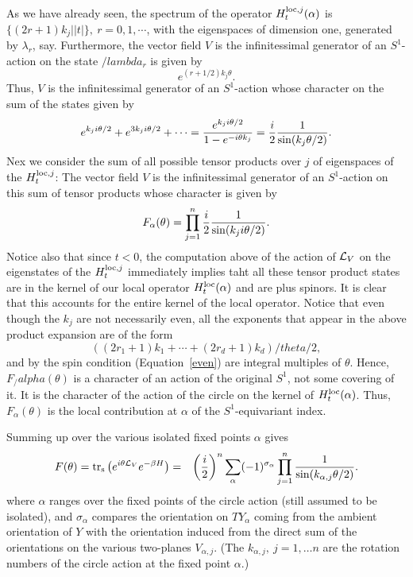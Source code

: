As we have already seen, the spectrum of the operator $H_t^{{\rm
loc},j}(\alpha)$  
is $\{(2r+1)k_j||t|\},\ r=0,1,\cdots$, with the eigenspaces of
dimension one, generated by $\lambda_r$, say.
Furthermore,  the vector field $V$ is the infinitessimal generator of
an $S^1$-action on the 
state  $/lambda_r$ is given by 
$$e^{(r+1/2)k_j\theta}.$$
Thus, $V$ is the infinitessimal generator of an $S^1$-action whose character
on the sum of the states given by 
\begin{equation}\label{thetaform}
e^{k_ji\theta/2}+e^{3k_ji\theta/2}+\cdots
=\frac{e^{k_ji\theta/2}}{1-e^{-i\theta k_j}}= \frac{i}{2}\frac{1}{{\rm
sin}(k_j\theta/2)}. 
\end{equation}
Nex we consider the sum of all possible tensor products over $j$ of 
eigenspaces of the $H_t^{{\rm loc},j}$:
The  vector field $V$ is the infinitessimal generator of an $S^1$-action on
this sum of tensor products whose character is given by 
\begin{equation}\label{product}
F_\alpha(\theta)=\prod_{j=1}^n\frac{i}{2}\frac{1}{{\rm sin}(k_ji\theta/2)}.
\end{equation}
Notice also that since $t<0$, the computation above of the action of
${\cal L}_V$ on the eigenstates of the $H_t^{{\rm loc},j}$ immediately
implies taht  all these tensor product states are in the kernel of our
local operator $H_t^{\rm loc}(\alpha)$ and are plus spinors.
It is clear that this accounts for the entire kernel of the local
operator. 
Notice that even though the $k_j$ are not necessarily even, all the
exponents that appear in the above product expansion are of the form
$$\left((2r_1+1)k_1+\cdots+(2r_d+1)k_d\right)/theta/2,$$
and by the spin condition (Equation~\ref{even}) are integral multiples
of $\theta$.  Hence, $F_/alpha(\theta)$ is a character of an action of
the original $S^1$, not some covering of it.
It is the character of the action of the circle on  the kernel of
$H_t^{\rm loc}(\alpha)$. Thus, $F_\alpha(\theta)$ 
is the local contribution at $\alpha$ of the 
$S^1$-equivariant index.
 
Summing up over  the various isolated fixed
points  $\alpha$ gives
\begin{eqnarray*}
F(\theta) = {\rm tr_s}\left(e^{i\theta{\cal L}_V}e^{-\beta
H}\right)
& = & \left(\frac{i}{2}\right)^n\sum_{\alpha}
(-1)^{\sigma_\alpha}\prod_{j=1}^n\frac{1}{{\rm
sin}(k_{\alpha,j}\theta/2)}. 
\end{eqnarray*}
 where $\alpha$ ranges over the fixed points of the circle action
(still assumed to be isolated), and $\sigma_\alpha$ compares the
orientation on $TY_\alpha$ coming 
from the ambient orientation of $Y$ with the orientation induced from
the direct sum of the orientations on the various two-planes $V_{\alpha,j}$.
(The $k_{\alpha,j},\ j=1,\ldots n$ are the rotation numbers of the
circle action at the fixed point $\alpha$.)

